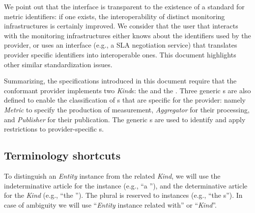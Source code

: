 \documentclass[10pt]{article}  %
\begin{document}


We point out that the interface is transparent to the existence of a standard for metric identifiers: if one exists, the interoperability of distinct monitoring infrastructures is certainly improved. We consider that the user that interacts with the monitoring infrastructures either knows about the identifiers used by the provider, or uses an interface (e.g., a SLA negotiation service) that translates provider specific identifiers into interoperable ones. This document highlights other similar standardization issues.

Summarizing, the specifications introduced in this document require that the conformant provider implements two {\em Kind}s: the {\em \coll } and the {\em \sens }. Three generic \mi s are also defined to enable the classification of \mi s that are specific for the provider: namely {\em Metric} to specify the production of measurement, {\em Aggregator} for their processing, and {\em Publisher} for their publication. The generic \mi s are used to identify and apply restrictions to provider-specific \mi s. 

\subsection{Terminology shortcuts}

To distinguish an {\em Entity} instance from the related {\em Kind}, we will use the indeterminative article for the instance (e.g., ``a \rs''), and the determinative article for the {\em Kind} (e.g., ``the \rs''). The plural is reserved to instances (e.g., ``the \rs s''). In case of ambiguity we will use ``{\em Entity} instance related with'' or ``{\em Kind}''. 
\end{document}
